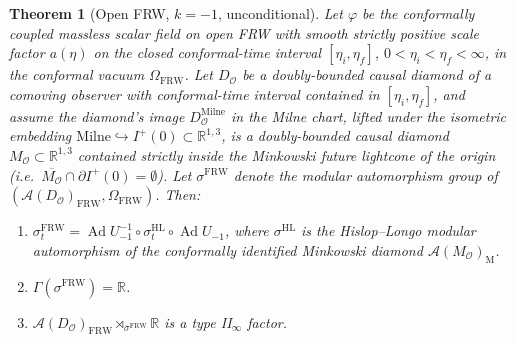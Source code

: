 \documentclass[11pt]{article}
\newtheorem{theorem}{Theorem}
\theoremstyle{definition}
\newcommand{\R}{\mathbb{R}}
\renewcommand{\AA}{\mathcal{A}}
\newcommand{\OO}{\mathcal{O}}
\newcommand{\Ad}{\operatorname{Ad}}
\newcommand{\HL}{\mathrm{HL}}
\newcommand{\FRW}{\mathrm{FRW}}
\newcommand{\Mink}{\mathrm{M}}
\newcommand{\Milne}{\mathrm{Milne}}
\begin{document}
\begin{theorem}[Open FRW, $k=-1$, unconditional]\label{thm:open}
Let $\varphi$ be the conformally coupled massless scalar field on open FRW
with smooth strictly positive scale factor $a(\eta)$ on the closed
conformal-time interval $[\eta_i,\eta_f]$, $0<\eta_i<\eta_f<\infty$, in the
conformal vacuum $\Omega_\FRW$. Let $D_\OO$ be a doubly-bounded causal
diamond of a comoving observer with conformal-time interval contained in
$[\eta_i,\eta_f]$, and assume the diamond's image $D_\OO^\Milne$ in the
Milne chart, lifted under the isometric embedding
$\Milne\hookrightarrow I^+(0)\subset\R^{1,3}$, is a doubly-bounded causal
diamond $M_\OO\subset\R^{1,3}$ contained strictly inside the Minkowski
future lightcone of the origin (i.e.\ $\overline{M_\OO}\cap\partial I^+(0)
= \emptyset$). Let $\sigma^\FRW$ denote the modular automorphism group of
$(\AA(D_\OO)_\FRW,\Omega_\FRW)$. Then:
\begin{enumerate}
\item $\sigma^\FRW_t = \Ad U_{-1}^{-1}\circ\sigma^\HL_t\circ\Ad U_{-1}$,
where $\sigma^\HL$ is the Hislop--Longo modular automorphism of the
conformally identified Minkowski diamond $\AA(M_\OO)_\Mink$.
\item $\Gamma(\sigma^\FRW)=\R$.
\item $\AA(D_\OO)_\FRW\rtimes_{\sigma^\FRW}\R$ is a type II$_\infty$
factor.
\end{enumerate}
\end{theorem}
\end{document}
